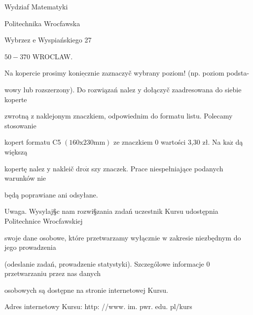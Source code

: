 \documentclass[a4paper,12pt]{article}
\begin{document}
Wydziaf Matematyki

Politechnika Wrocfawska

Wybrzez $\mathrm{e}$ Wyspiańskiego 27

$50-370$ WROCLAW.

Na kopercie prosimy $\underline{\mathrm{k}\mathrm{o}\mathrm{n}\mathrm{i}\mathrm{e}\mathrm{c}\mathrm{z}\mathrm{n}\mathrm{i}\mathrm{e}}$ zaznaczyč wybrany poziom! (np. poziom podsta-

wowy lub rozszerzony). Do rozwiązań nalez $\mathrm{y}$ dołączyč zaadresowana do siebie koperte

zwrotną $\mathrm{z}$ naklejonym znaczkiem, odpowiednim do formatu listu. Polecamy stosowanie

kopert formatu C5 $(160\mathrm{x}230\mathrm{m}\mathrm{m})$ ze znaczkiem $0$ wartości 3,30 zł. Na $\mathrm{k}\mathrm{a}\dot{\mathrm{z}}$ dą większą

kopertę nalez $\mathrm{y}$ nakleič $\mathrm{d}\mathrm{r}\mathrm{o}\dot{\mathrm{z}}$ szy znaczek. Prace niespełniające podanych warunków nie

będą poprawiane ani odsyłane.

Uwaga. Wysylaj\S c nam rozwi\S zania zadań uczestnik Kursu udostępnia Politechnice Wrocfawskiej

swoje dane osobowe, które przetwarzamy wyłącznie $\mathrm{w}$ zakresie niezbędnym do jego prowadzenia

(odeslanie zadań, prowadzenie statystyki). Szczególowe informacje $0$ przetwarzaniu przez nas danych

osobowych są dostępne na stronie internetowej Kursu.

Adres internetowy Kursu: http: //www. im. pwr. edu. pl/kurs
\end{document}
